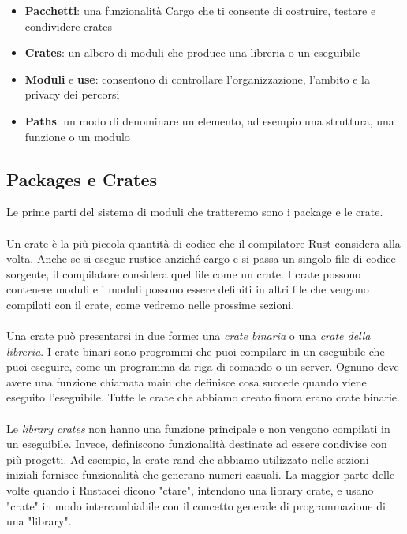 \documentclass[11pt,a4paper]{article}
\begin{document}
\begin{itemize}
\item \textbf{Pacchetti}: una funzionalità Cargo che ti consente di costruire, testare e condividere crates
\item \textbf{Crates}: un albero di moduli che produce una libreria o un eseguibile
\item \textbf{Moduli} e \textbf{use}: consentono di controllare l'organizzazione, l'ambito e la privacy dei percorsi
\item \textbf{Paths}: un modo di denominare un elemento, ad esempio una struttura, una funzione o un modulo
\end{itemize}

\subsection{Packages e Crates}
Le prime parti del sistema di moduli che tratteremo sono i package e le crate.\\
\\
Un crate è la più piccola quantità di codice che il compilatore Rust considera alla volta. Anche se si esegue rusticc anziché cargo e si passa un singolo file di codice sorgente, il compilatore considera quel file come un crate. I crate possono contenere moduli e i moduli possono essere definiti in altri file che vengono compilati con il crate, come vedremo nelle prossime sezioni.\\
\\
Una crate può presentarsi in due forme: una \textit{crate binaria} o una \textit{crate della libreria}. I crate binari sono programmi che puoi compilare in un eseguibile che puoi eseguire, come un programma da riga di comando o un server. Ognuno deve avere una funzione chiamata main che definisce cosa succede quando viene eseguito l'eseguibile. Tutte le crate che abbiamo creato finora erano crate binarie.\\
\\
Le \textit{library crates} non hanno una funzione principale e non vengono compilati in un eseguibile. Invece, definiscono funzionalità destinate ad essere condivise con più progetti. Ad esempio, la crate rand che abbiamo utilizzato nelle sezioni iniziali fornisce funzionalità che generano numeri casuali. La maggior parte delle volte quando i Rustacei dicono "ctare", intendono una library crate, e usano "crate" in modo intercambiabile con il concetto generale di programmazione di una "library".\\
\\
\end{document}
